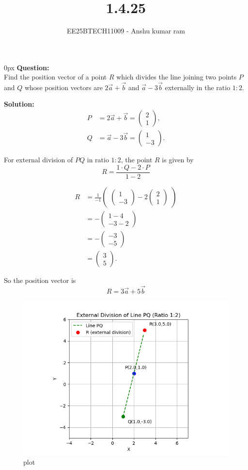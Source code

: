 \documentclass[journal]{IEEEtran}
\newcommand{\solution}{\textbf{Solution: }}
\newcommand{\brak}[1]{\begin{pmatrix}#1\end{pmatrix}}
\begin{document}

\vspace{3cm}

\title{1.4.25}
\author{EE25BTECH11009 - Anshu kumar ram}
{\let\newpage\relax\maketitle}

\renewcommand{\thefigure}{\theenumi}
\renewcommand{\thetable}{\theenumi}
\setlength{\intextsep}{10pt}

\parindent 0px
\textbf{Question:} \\
Find the position vector of a point $R$ which divides the line joining two points $P$ and $Q$ whose position vectors are $2\vec{a} + \vec{b}$ and $\vec{a} - 3\vec{b}$ externally in the ratio $1:2$.

\solution \\

\begin{align}
P &= 2\vec{a} + \vec{b}
   = \brak{2\\1}, \\
Q &= \vec{a} - 3\vec{b}
   = \brak{1\\-3}.
\end{align}

For external division of $PQ$ in ratio $1:2$,  
the point $R$ is given by
\begin{equation}
R = \frac{1 \cdot Q - 2 \cdot P}{1-2}
\end{equation}

\begin{align}
R &= \frac{1}{-1}\brak{\brak{1\\-3} - 2\brak{2\\1}} \\[6pt]
  &= -\brak{1-4\\-3-2} \\[6pt]
  &= -\brak{-3\\-5} \\[6pt]
  &= \brak{3\\5}.
\end{align}

So the position vector is
\begin{equation}
R = 3\vec{a} + 5\vec{b}
\end{equation}

\begin{figure}[h]
    \centering
    \includegraphics[width=\columnwidth, keepaspectratio]{figs/section_graph.png}
    \captionsetup{justification=centering}
    \caption{plot}
    \label{fig:section_graph}
\end{figure}
\end{document}
